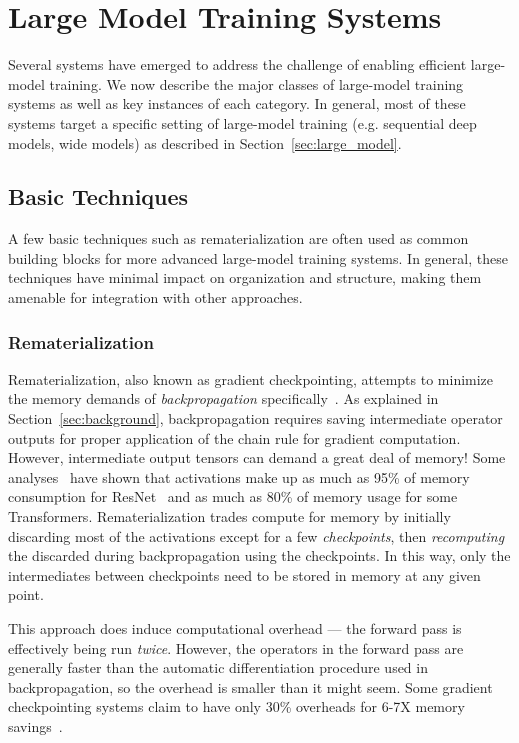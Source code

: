 \vspace{-2mm}
\section{Large Model Training Systems}\label{sec:mlsys}
Several systems have emerged to address the challenge of enabling efficient large-model training. We now describe the major classes of large-model training systems as well as key instances of each category. In general, most of these systems target a specific setting of large-model training (e.g. sequential deep models, wide models) as described in Section~\ref{sec:large_model}.

\subsection{Basic Techniques}
A few basic techniques such as rematerialization are often used as common building blocks for more advanced large-model training systems. In general, these techniques have minimal impact on organization and structure, making them amenable for integration with other approaches.

\subsubsection{Rematerialization}
Rematerialization, also known as gradient checkpointing, attempts to minimize the memory demands of \textit{backpropagation} specifically~\cite{checkpointing2000, checkpointing2016}. As explained in Section~\ref{sec:background}, backpropagation requires saving intermediate operator outputs for proper application of the chain rule for gradient computation. However, intermediate output tensors can demand a great deal of memory!  Some analyses~\cite{lowmemory2019} have shown that activations make up as much as 95\% of memory consumption for ResNet~\cite{resnet2015} and as much as 80\% of memory usage for some Transformers. Rematerialization trades compute for memory by initially discarding most of the activations except for a few \textit{checkpoints}, then \textit{recomputing} the discarded during backpropagation using the checkpoints. In this way, only the intermediates between checkpoints need to be stored in memory at any given point.

This approach does induce computational overhead --- the forward pass is effectively being run \textit{twice}. However, the operators in the forward pass are generally faster than the automatic differentiation procedure used in backpropagation, so the overhead is smaller than it might seem. Some gradient checkpointing systems claim to have only 30\% overheads for 6-7X memory savings~\cite{checkpointing2016}.

